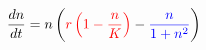 \documentclass[10pt]{article}
\begin{document}
\begin{align*}\frac{dn}{dt} = n \left( {\color[rgb]{1,0,0}r\left(1 - \frac{n}{K}\right)} - {\color[rgb]{0,0,1}\frac{n}{1+n^2}}\right)\end{align*}
\end{document}
